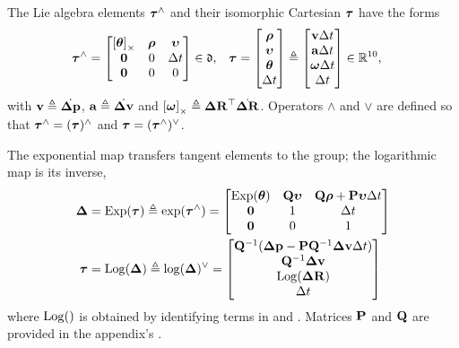 The Lie algebra elements ${\bm \tau}^\wedge$ and their isomorphic Cartesian ${\bm \tau}$ have the forms
%
\begin{align}\label{equ:lie_algebra}
    {\bm \tau}^\wedge &= \begin{bmatrix}
    \left[{{\bm \theta}}\right]_\times & {\bm \rho} & {\bm \upsilon} \\
    \bf0 & 0 & \Delta t \\
    \bf0 & 0 & 0
    \end{bmatrix} \in \mathfrak{d}
    ,&
    {\bm \tau} &= \begin{bmatrix}
    {\bm \rho} \\ {\bm \upsilon} \\ {{\bm \theta}} \\ \Delta t
    \end{bmatrix}
    \triangleq \begin{bmatrix}
    {\bf v}\Delta t \\ {\bf a}\Delta t \\ {{\bm \omega}}\Delta t \\ \Delta t
    \end{bmatrix} 
    \in {\mathbb R}^{10}
    ,
\end{align}
%
with ${\bf v}\triangleq\dot{{\bm \Delta {\bf p}}}$, ${\bf a}\triangleq\dot{{\bm \Delta {\bf v}}}$ and $\left[{{\bm \omega}}\right]_\times\triangleq{\bm \Delta {\bf R}}^{\top}\dot{{\bm \Delta {\bf R}}}$.
Operators $\wedge$ and $\vee$ are defined so that ${\bm \tau}^\wedge=({\bm \tau})^\wedge$ and ${\bm \tau}=({\bm \tau}^\wedge)^\vee$.

The exponential map transfers tangent elements to the group; the logarithmic map is its inverse,
%
\begin{align}
    \D &= \Exp(\bftau) \te \exp(\bftau\hhat) = \begin{bmatrix}
    \Exp(\bth) & \bfQ\bfupsilon & \bfQ\bfrho+\bfP\bfupsilon\Dt \\
    \bf0 & 1 & \Dt \\
    \bf0 & 0 & 1
    \end{bmatrix} %
    \label{equ:exp}
    \\
    \bftau &= \Log(\D) \te \log(\D)\vvee = \begin{bmatrix}
    \bfQ\inv(\Dp-\bfP\bfQ\inv\Dv\Dt) \\
    \bfQ\inv\Dv \\
    \Log(\DR) \\
    \Dt 
    \end{bmatrix} %
    \label{equ:log}
\end{align}
%
where $\operatorname*{Log}()$ is obtained by identifying terms in  and .
Matrices ${\bf P}$ and ${\bf Q}$ are provided in the appendix's .


